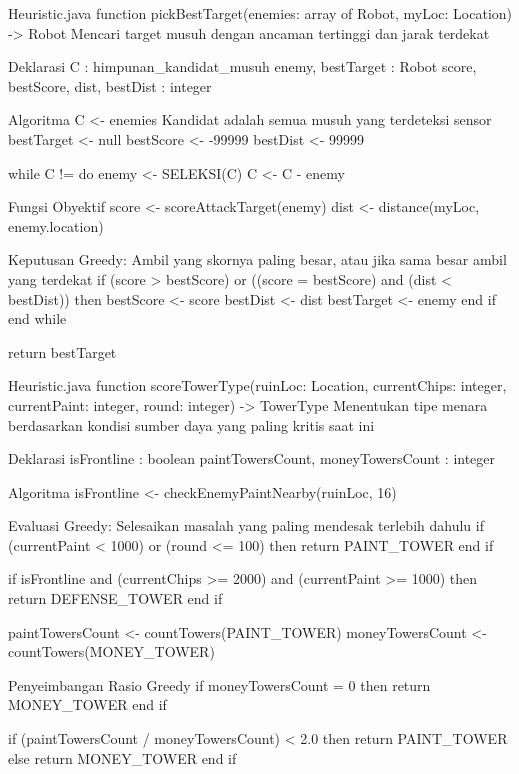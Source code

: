 \begin{pseudocode}{Heuristic.java}
    function pickBestTarget(enemies: array of Robot, myLoc: Location) -> Robot
    { Mencari target musuh dengan ancaman tertinggi dan jarak terdekat }

    { Deklarasi }
    C : himpunan_kandidat_musuh
    enemy, bestTarget : Robot
    score, bestScore, dist, bestDist : integer

    { Algoritma }
    C <- enemies { Kandidat adalah semua musuh yang terdeteksi sensor }
    bestTarget <- null
    bestScore <- -99999
    bestDist <- 99999

    while C != {} do
        enemy <- SELEKSI(C)
        C <- C - {enemy}
        
        { Fungsi Obyektif }
        score <- scoreAttackTarget(enemy)
        dist <- distance(myLoc, enemy.location)
        
        { Keputusan Greedy: Ambil yang skornya paling besar, atau jika sama besar ambil yang terdekat }
        if (score > bestScore) or ((score = bestScore) and (dist < bestDist)) then
            bestScore <- score
            bestDist <- dist
            bestTarget <- enemy
        end if
    end while

    return bestTarget
\end{pseudocode}

\begin{pseudocode}{Heuristic.java}
    function scoreTowerType(ruinLoc: Location, currentChips: integer, currentPaint: integer, round: integer) -> TowerType
    { Menentukan tipe menara berdasarkan kondisi sumber daya yang paling kritis saat ini }

    { Deklarasi }
    isFrontline : boolean
    paintTowersCount, moneyTowersCount : integer

    { Algoritma }
    isFrontline <- checkEnemyPaintNearby(ruinLoc, 16)

    { Evaluasi Greedy: Selesaikan masalah yang paling mendesak terlebih dahulu }
    if (currentPaint < 1000) or (round <= 100) then
        return PAINT_TOWER
    end if

    if isFrontline and (currentChips >= 2000) and (currentPaint >= 1000) then
        return DEFENSE_TOWER
    end if

    paintTowersCount <- countTowers(PAINT_TOWER)
    moneyTowersCount <- countTowers(MONEY_TOWER)

    { Penyeimbangan Rasio Greedy }
    if moneyTowersCount = 0 then
        return MONEY_TOWER
    end if

    if (paintTowersCount / moneyTowersCount) < 2.0 then
        return PAINT_TOWER
    else
        return MONEY_TOWER
    end if
\end{pseudocode}

